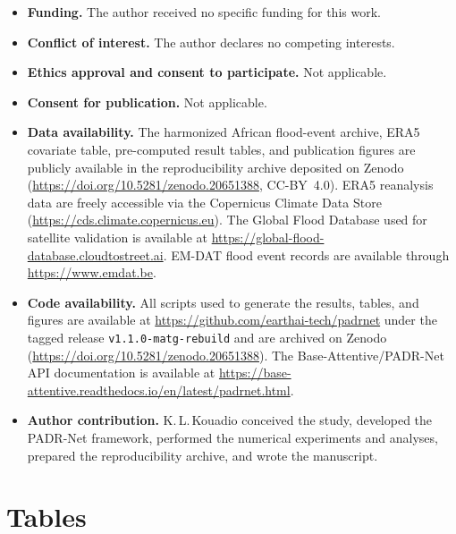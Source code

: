 \documentclass[pdflatex,sn-mathphys-ay]{sn-jnl}
\theoremstyle{thmstyleone}
\begin{document}
\begin{itemize}
\item \textbf{Funding.}
  The author received no specific funding for this work.

\item \textbf{Conflict of interest.}
  The author declares no competing interests.

\item \textbf{Ethics approval and consent to participate.}
  Not applicable.

\item \textbf{Consent for publication.}
  Not applicable.

\item \textbf{Data availability.}
  The harmonized African flood-event archive, ERA5 covariate table,
  pre-computed result tables, and publication figures are publicly
  available in the reproducibility archive deposited on Zenodo
  (\url{https://doi.org/10.5281/zenodo.20651388}, CC-BY~4.0).  ERA5
  reanalysis data are freely accessible via the Copernicus Climate Data
  Store (\url{https://cds.climate.copernicus.eu}).  The Global Flood
  Database used for satellite validation is available at
  \url{https://global-flood-database.cloudtostreet.ai}.  EM-DAT flood
  event records are available through \url{https://www.emdat.be}.

\item \textbf{Code availability.}
  All scripts used to generate the results, tables, and figures are
  available at \url{https://github.com/earthai-tech/padrnet} under the
  tagged release \texttt{v1.1.0-matg-rebuild} and are archived on
  Zenodo (\url{https://doi.org/10.5281/zenodo.20651388}).  The
  Base-Attentive/PADR-Net API documentation is available at
  \url{https://base-attentive.readthedocs.io/en/latest/padrnet.html}.

\item \textbf{Author contribution.}
  K.\,L.\,Kouadio conceived the study, developed the PADR-Net
  framework, performed the numerical experiments and analyses, prepared
  the reproducibility archive, and wrote the manuscript.
\end{itemize}


\clearpage
\section*{Tables}
\end{document}
